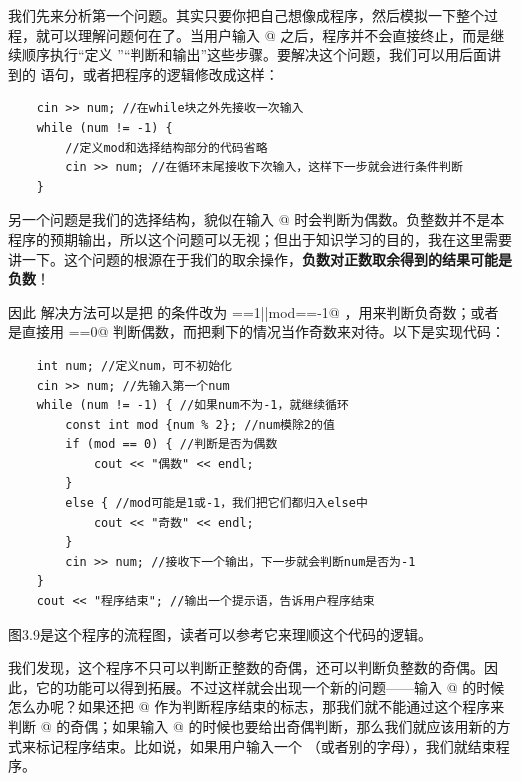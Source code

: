 我们先来分析第一个问题。其实只要你把自己想像成程序，然后模拟一下整个过程，就可以理解问题何在了。当用户输入 @ 之后，程序并不会直接终止，而是继续顺序执行``定义 \lstinline@mod@''``判断和输出''这些步骤。要解决这个问题，我们可以用后面讲到的 \lstinline@break@ 语句，或者把程序的逻辑修改成这样：
\begin{lstlisting}
    cin >> num; //在while块之外先接收一次输入
    while (num != -1) {
        //定义mod和选择结构部分的代码省略
        cin >> num; //在循环末尾接收下次输入，这样下一步就会进行条件判断
    }
\end{lstlisting}\par
另一个问题是我们的选择结构，貌似在输入 @ 时会判断为偶数。负整数并不是本程序的预期输出，所以这个问题可以无视；但出于知识学习的目的，我在这里需要讲一下。这个问题的根源在于我们的取余操作，\textbf{负数对正数取余得到的结果可能是负数}！\par
因此 %
解决方法可以是把 \lstinline@if@ 的条件改为 \lstinline@mod==1||mod==-1@ ，用来判断负奇数；或者是直接用 \lstinline@mod==0@ 判断偶数，而把剩下的情况当作奇数来对待。以下是实现代码：
\begin{lstlisting}
    int num; //定义num，可不初始化
    cin >> num; //先输入第一个num
    while (num != -1) { //如果num不为-1，就继续循环
    	const int mod {num % 2}; //num模除2的值
    	if (mod == 0) { //判断是否为偶数
            cout << "偶数" << endl;
    	}
    	else { //mod可能是1或-1，我们把它们都归入else中
            cout << "奇数" << endl;
    	}
    	cin >> num; //接收下一个输出，下一步就会判断num是否为-1
    }
    cout << "程序结束"; //输出一个提示语，告诉用户程序结束
\end{lstlisting}
图3.9是这个程序的流程图，读者可以参考它来理顺这个代码的逻辑。\par
我们发现，这个程序不只可以判断正整数的奇偶，还可以判断负整数的奇偶。因此，它的功能可以得到拓展。不过这样就会出现一个新的问题——输入 @ 的时候怎么办呢？如果还把 @ 作为判断程序结束的标志，那我们就不能通过这个程序来判断 @ 的奇偶；如果输入 @ 的时候也要给出奇偶判断，那么我们就应该用新的方式来标记程序结束。比如说，如果用户输入一个 \lstinline@q@（或者别的字母），我们就结束程序。\par

